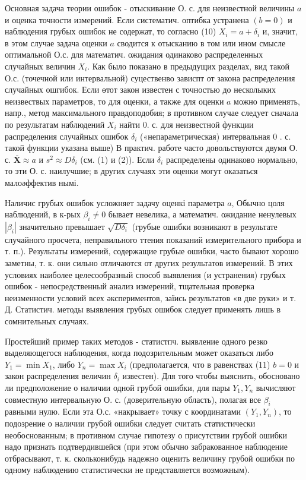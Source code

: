 \documentclass[10pt]{article}
\begin{document}
Основная задача теории ошибок - отыскивание О. с. для неизвестной величины $a$ и оценка точности измерений. Если систематич. оптибка устранена $(b=0)$ и наблюдения грубых ошибок не содержат, то согласно (10) $X_{i}=a+\delta_{i}$ и, значит, в этом случае задача оценки $a$ сводится к отысканию в том или ином смысле оптимальной О.с. для математич. ожидания одинаково распределенных случайных величин $X_{i}$. Как было показано в предыдущих разделах, вид такой О.с. (точечной или интервальной) суцественво зависпт от закона распределения случайных ошгибок. Если өтот закон известен с точностью до несколыких неизвествых параметров, то для оценки, а также для оценки $a$ можно применять, напр., метод максимального правдоподобия; в противном случае следует сначала по результатам наблюдений $X_{i}$ найти 0. с. для неизвестной функции распределения случайных ошибок $\delta_{i}$ («непараметрическая) интервальная 0 . с. такой функции указана выше) В практич. работе часто довольствуются двумя О. с. $\overline{\boldsymbol{X}} \approx a$ и $s^{2} \approx D \delta_{i}$ (см. (1) и (2)). Если $\delta_{i}$ распределены одинаково нормально, то эти О. с. наилучшие; в других случаях эти оценки могут оказаться малоәффектив нымі.

Наличис грубых ошибок усложняет задачу оценкі параметра $a$, Обычно цоля наблюдений, в к-рых $\beta_{i} \neq 0$ бывает невелика, а математич. ожидание ненулевых $\left|\beta_{i}\right|$ значительно превышает $\sqrt{D \delta_{i}}$ (грубые ошибки возникают в результате случайного просчета, неправильного ттения показаний измерительного прибора и т. п.). Результаты измерений, содержащие грубые ошибки, часто бывают хорошо заметны, т. к. они сильно отличаются от других результатов измерений. В этих условиях наиболее целесообразный способ выявления (и устранения) грубых ошибок - непосредственный анализ измерений, тщательная проверка неизменности условий всех әкспериментов, заїись результатов «в две руки» и т. Д. Статистич. методы выявления грубых ошибок следует применять лишь в сомнительных случаях.

Простейший пример таких методов - статистпч. выявление одного резко выделяющегося наблюдения, когда подозрительным может оказаться либо $Y_{1}=\min X_{1}$, либо $Y_{n}=\max X_{i}$ (предполагается, что в равенствах (11) $b=0$ и закон распределения величин $\delta_{i}$ известен). Для того чтобы выяснить, обосновано ли предположение о наличии одной грубой ошибки, для пары $Y_{1}, Y_{n}$ вычисляют совместную интервальную О. с. (доверительную область), полагая все $\beta_{i}$ равными нулю. Если эта О.с. «накрывает» точку с координатами $\left(Y_{1}, Y_{n}\right)$, то подозрение о наличии грубой ошибки следует считать статистически необоснованным; в противном случае гипотезу о присутствии грубой ошибки надо признать подтвердившейся (при этом обычно забракованное наблюдение отбрасывают, т. к. скольконибудь надежно оценить величину грубой ошибки по одному наблюдению статистически не представляется возможным).
\end{document}
